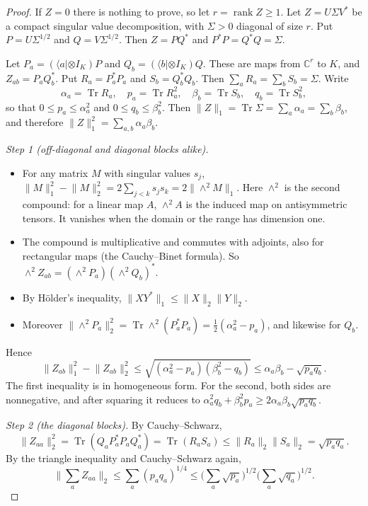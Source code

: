\documentclass[11pt]{article}
\theoremstyle{remark}
\newcommand{\Tr}{\operatorname{Tr}}
\newcommand{\norm}[1]{\lVert #1\rVert}
\begin{document}
\begin{proof}
If $Z=0$ there is nothing to prove, so let $r=\operatorname{rank}Z\ge1$. Let $Z=U\Sigma V^*$ be a compact singular value
decomposition, with $\Sigma>0$ diagonal of size $r$. Put $P=U\Sigma^{1/2}$ and $Q=V\Sigma^{1/2}$. Then $Z=PQ^*$ and
$P^*P=Q^*Q=\Sigma$.

Let $P_a=(\langle a|\otimes I_K)P$ and $Q_b=(\langle b|\otimes I_K)Q$. These are maps from $\mathbb C^r$ to $K$, and
$Z_{ab}=P_aQ_b^*$. Put $R_a=P_a^*P_a$ and $S_b=Q_b^*Q_b$. Then $\sum_aR_a=\sum_bS_b=\Sigma$. Write
\[
\alpha_a=\Tr R_a,\quad p_a=\Tr R_a^2,\quad \beta_b=\Tr S_b,\quad q_b=\Tr S_b^2,
\]
so that $0\le p_a\le\alpha_a^2$ and $0\le q_b\le\beta_b^2$. Then $\norm{Z}_1=\Tr\Sigma=\sum_a\alpha_a=\sum_b\beta_b$, and
therefore $\norm{Z}_1^2=\sum_{a,b}\alpha_a\beta_b$.

\emph{Step 1 (off-diagonal and diagonal blocks alike).}
\begin{itemize}
\item For any matrix $M$ with singular values $s_j$,
$\norm{M}_1^2-\norm{M}_2^2=2\sum_{j<k}s_js_k=2\norm{\wedge^2M}_1$.
Here $\wedge^2$ is the second compound: for a linear map $A$, $\wedge^2A$ is the induced map on antisymmetric tensors.
It vanishes when the domain or the range has dimension one.
\item The compound is multiplicative and commutes with adjoints, also for rectangular maps (the Cauchy--Binet formula).
So $\wedge^2Z_{ab}=(\wedge^2P_a)(\wedge^2Q_b)^*$.
\item By H\"older's inequality, $\norm{XY^*}_1\le\norm{X}_2\norm{Y}_2$.
\item Moreover $\norm{\wedge^2P_a}_2^2=\Tr\wedge^2(P_a^*P_a)=\tfrac12(\alpha_a^2-p_a)$, and likewise for $Q_b$.
\end{itemize}
Hence
\begin{equation}\label{eq:s1}
\norm{Z_{ab}}_1^2-\norm{Z_{ab}}_2^2\le\sqrt{(\alpha_a^2-p_a)(\beta_b^2-q_b)}\le\alpha_a\beta_b-\sqrt{p_aq_b}.
\end{equation}
The first inequality is \cite[Lemma~5.1]{WuZou} in homogeneous form. For the second, both sides are nonnegative, and after
squaring it reduces to $\alpha_a^2q_b+\beta_b^2p_a\ge2\alpha_a\beta_b\sqrt{p_aq_b}$.

\emph{Step 2 (the diagonal blocks).} By Cauchy--Schwarz,
\[
\norm{Z_{aa}}_2^2=\Tr(Q_aP_a^*P_aQ_a^*)=\Tr(R_aS_a)\le\norm{R_a}_2\norm{S_a}_2=\sqrt{p_aq_a}.
\]
By the triangle inequality and Cauchy--Schwarz again,
\begin{equation}\label{eq:s2}
\Big\|\sum_aZ_{aa}\Big\|_2\le\sum_a(p_aq_a)^{1/4}\le\Big(\sum_a\sqrt{p_a}\Big)^{1/2}\Big(\sum_a\sqrt{q_a}\Big)^{1/2}.
\end{equation}


\end{proof}
\end{document}

